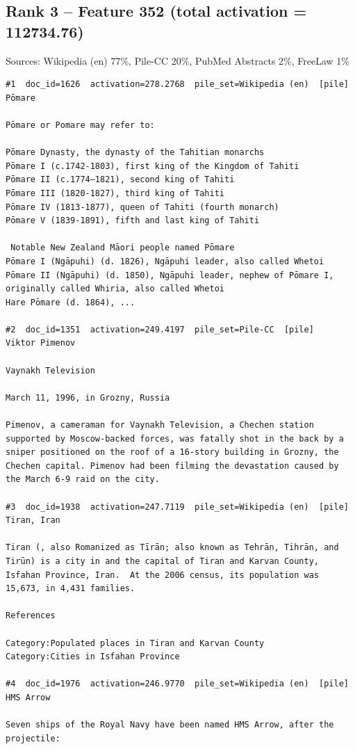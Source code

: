 \subsection*{Rank 3 -- Feature 352 (total activation = 112734.76)}

Sources: Wikipedia (en) 77\%, Pile-CC 20\%, PubMed Abstracts 2\%, FreeLaw 1\%

\begin{verbatim}
#1  doc_id=1626  activation=278.2768  pile_set=Wikipedia (en)  [pile]
Pōmare

Pōmare or Pomare may refer to:

Pōmare Dynasty, the dynasty of the Tahitian monarchs
Pōmare I (c.1742-1803), first king of the Kingdom of Tahiti
Pōmare II (c.1774–1821), second king of Tahiti
Pōmare III (1820-1827), third king of Tahiti
Pōmare IV (1813-1877), queen of Tahiti (fourth monarch)
Pōmare V (1839-1891), fifth and last king of Tahiti

 Notable New Zealand Māori people named Pōmare
Pōmare I (Ngāpuhi) (d. 1826), Ngāpuhi leader, also called Whetoi
Pōmare II (Ngāpuhi) (d. 1850), Ngāpuhi leader, nephew of Pōmare I, originally called Whiria, also called Whetoi
Hare Pōmare (d. 1864), ...

#2  doc_id=1351  activation=249.4197  pile_set=Pile-CC  [pile]
Viktor Pimenov

Vaynakh Television

March 11, 1996, in Grozny, Russia

Pimenov, a cameraman for Vaynakh Television, a Chechen station supported by Moscow-backed forces, was fatally shot in the back by a sniper positioned on the roof of a 16-story building in Grozny, the Chechen capital. Pimenov had been filming the devastation caused by the March 6-9 raid on the city.

#3  doc_id=1938  activation=247.7119  pile_set=Wikipedia (en)  [pile]
Tiran, Iran

Tiran (, also Romanized as Tīrān; also known as Tehrān, Tihrān, and Tirūn) is a city in and the capital of Tiran and Karvan County, Isfahan Province, Iran.  At the 2006 census, its population was 15,673, in 4,431 families.

References

Category:Populated places in Tiran and Karvan County
Category:Cities in Isfahan Province

#4  doc_id=1976  activation=246.9770  pile_set=Wikipedia (en)  [pile]
HMS Arrow

Seven ships of the Royal Navy have been named HMS Arrow, after the projectile:


\end{verbatim}

